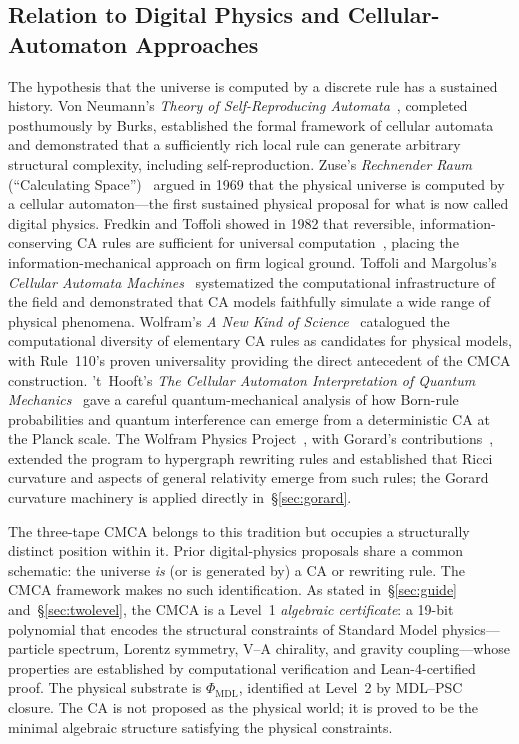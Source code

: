 \documentclass[11pt]{article}
\theoremstyle{remark}
\newcommand{\PHIMDL}{\Phi_{\mathrm{MDL}}}
\newcommand{\CMCA}{\text{CMCA}}
\begin{document}
\subsection{Relation to Digital Physics and Cellular-Automaton Approaches}
\label{sec:digital-physics}

The hypothesis that the universe is computed by a discrete rule has a sustained
history.
Von Neumann's \emph{Theory of Self-Reproducing Automata}~\cite{vonNeumann1966},
completed posthumously by Burks, established the formal framework of cellular
automata and demonstrated that a sufficiently rich local rule can generate
arbitrary structural complexity, including self-reproduction.
Zuse's \emph{Rechnender Raum} (``Calculating Space'')~\cite{Zuse1969}
argued in 1969 that the physical universe is computed by a cellular
automaton---the first sustained physical proposal for what is now called
digital physics.
Fredkin and Toffoli showed in 1982 that reversible, information-conserving CA
rules are sufficient for universal computation~\cite{fredkin1982conservative},
placing the information-mechanical approach on firm logical ground.
Toffoli and Margolus's \emph{Cellular Automata Machines}~\cite{ToffoliMargolus1987}
systematized the computational infrastructure of the field and demonstrated that
CA models faithfully simulate a wide range of physical phenomena.
Wolfram's \emph{A New Kind of Science}~\cite{Wolfram2002} catalogued the
computational diversity of elementary CA rules as candidates for physical models,
with Rule~110's proven universality providing the direct antecedent of the
CMCA construction.
't~Hooft's \emph{The Cellular Automaton Interpretation of Quantum
Mechanics}~\cite{tHooft2016CA} gave a careful quantum-mechanical analysis of
how Born-rule probabilities and quantum interference can emerge from a
deterministic CA at the Planck scale.
The Wolfram Physics Project~\cite{Wolfram2020Tech}, with Gorard's
contributions~\cite{Gorard2020Rel}, extended the program to hypergraph
rewriting rules and established that Ricci curvature and aspects of general
relativity emerge from such rules; the Gorard curvature machinery is applied
directly in~\S\ref{sec:gorard}.

The three-tape $\CMCA$ belongs to this tradition but occupies a structurally
distinct position within it.
Prior digital-physics proposals share a common schematic: the universe
\emph{is} (or is generated by) a CA or rewriting rule.
The $\CMCA$ framework makes no such identification.
As stated in~\S\ref{sec:guide} and~\S\ref{sec:twolevel}, the CMCA is a
Level~1 \emph{algebraic certificate}: a 19-bit polynomial that encodes the
structural constraints of Standard Model physics---particle spectrum, Lorentz
symmetry, V--A chirality, and gravity coupling---whose properties are
established by computational verification and Lean-4-certified proof.
The physical substrate is $\PHIMDL$, identified at Level~2 by MDL--PSC
closure.
The CA is not proposed as the physical world; it is proved to be the minimal
algebraic structure satisfying the physical constraints.
\end{document}

